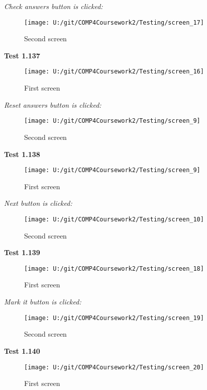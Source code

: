 \textit{Check answers button is clicked: }

\begin{figure}[H]
    \label{fig: Second Screen}\caption{Second screen}
    \texttt{[image: U:/git/COMP4Coursework2/Testing/screen\_17]}
\end{figure}

\textbf{Test 1.137}

\begin{figure}[H]
    \label{fig: First Screen}\caption{First screen}
    \texttt{[image: U:/git/COMP4Coursework2/Testing/screen\_16]}
\end{figure}

\textit{Reset answers button is clicked: }

\begin{figure}[H]
    \label{fig: Second Screen}\caption{Second screen}
    \texttt{[image: U:/git/COMP4Coursework2/Testing/screen\_9]}
\end{figure}

\textbf{Test 1.138}

\begin{figure}[H]
    \label{fig: First Screen}\caption{First screen}
    \texttt{[image: U:/git/COMP4Coursework2/Testing/screen\_9]}
\end{figure}

\textit{Next button is clicked: }

\begin{figure}[H]
    \label{fig: Second Screen}\caption{Second screen}
    \texttt{[image: U:/git/COMP4Coursework2/Testing/screen\_10]}
\end{figure}

\textbf{Test 1.139}

\begin{figure}[H]
    \label{fig: First Screen}\caption{First screen}
    \texttt{[image: U:/git/COMP4Coursework2/Testing/screen\_18]}
\end{figure}

\textit{Mark it button is clicked: }

\begin{figure}[H]
    \label{fig: Second Screen}\caption{Second screen}
    \texttt{[image: U:/git/COMP4Coursework2/Testing/screen\_19]}
\end{figure}

\textbf{Test 1.140}

\begin{figure}[H]
    \label{fig: First Screen}\caption{First screen}
    \texttt{[image: U:/git/COMP4Coursework2/Testing/screen\_20]}
\end{figure}

